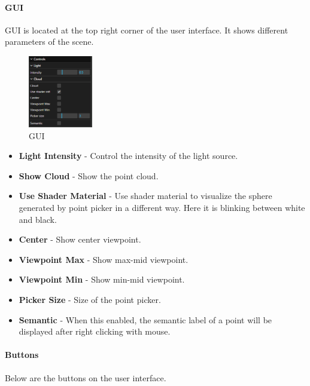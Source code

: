 \documentclass[11pt, a4paper,oneside,chapterprefix=false]{scrbook}
\begin{document}
\paragraph{GUI}

GUI is located at the top right corner of the user interface. It shows different parameters of the scene.

\begin{figure}[H]
    \centering
    \includegraphics*[width=0.25\textwidth]{figures/gui.png}
    \caption{GUI}
    \label{fig:gui}
\end{figure}

\begin{itemize}
	\item \textbf{Light Intensity} - Control the intensity of the light source.
	\item \textbf{Show Cloud} - Show the point cloud.
	\item \textbf{Use Shader Material} - Use shader material to visualize the sphere generated by point picker in a different way. Here it is blinking between white and black.
	\item \textbf{Center} - Show center viewpoint.
	\item \textbf{Viewpoint Max} - Show max-mid viewpoint.
	\item \textbf{Viewpoint Min} - Show min-mid viewpoint.
	\item \textbf{Picker Size} - Size of the point picker.
        \item  \textbf{Semantic} - When this enabled, the semantic label of a point will be displayed after right clicking with mouse.
\end{itemize}

\paragraph{Buttons}

Below are the buttons on the user interface.
\end{document}
